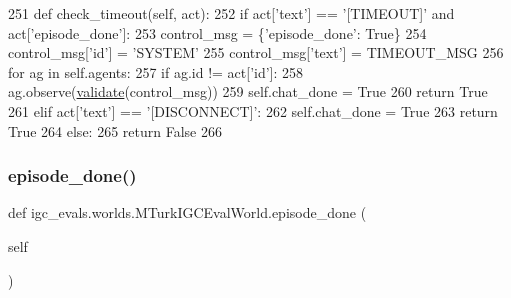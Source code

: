 \begin{DoxyCode}
251     \textcolor{keyword}{def }check\_timeout(self, act):
252         \textcolor{keywordflow}{if} act[\textcolor{stringliteral}{'text'}] == \textcolor{stringliteral}{'[TIMEOUT]'} \textcolor{keywordflow}{and} act[\textcolor{stringliteral}{'episode\_done'}]:
253             control\_msg = \{\textcolor{stringliteral}{'episode\_done'}: \textcolor{keyword}{True}\}
254             control\_msg[\textcolor{stringliteral}{'id'}] = \textcolor{stringliteral}{'SYSTEM'}
255             control\_msg[\textcolor{stringliteral}{'text'}] = TIMEOUT\_MSG
256             \textcolor{keywordflow}{for} ag \textcolor{keywordflow}{in} self.agents:
257                 \textcolor{keywordflow}{if} ag.id != act[\textcolor{stringliteral}{'id'}]:
258                     ag.observe(\hyperlink{namespaceparlai_1_1core_1_1worlds_afc3fad603b7bce41dbdc9cdc04a9c794}{validate}(control\_msg))
259             self.chat\_done = \textcolor{keyword}{True}
260             \textcolor{keywordflow}{return} \textcolor{keyword}{True}
261         \textcolor{keywordflow}{elif} act[\textcolor{stringliteral}{'text'}] == \textcolor{stringliteral}{'[DISCONNECT]'}:
262             self.chat\_done = \textcolor{keyword}{True}
263             \textcolor{keywordflow}{return} \textcolor{keyword}{True}
264         \textcolor{keywordflow}{else}:
265             \textcolor{keywordflow}{return} \textcolor{keyword}{False}
266 
\end{DoxyCode}
\mbox{\label{classigc__evals_1_1worlds_1_1MTurkIGCEvalWorld_a8c3a8c5efdefb5a5475f3290358c2e86}} 
\subsubsection{\texorpdfstring{episode\+\_\+done()}{episode\_done()}}
{\footnotesize\ttfamily def igc\+\_\+evals.\+worlds.\+M\+Turk\+I\+G\+C\+Eval\+World.\+episode\+\_\+done (\begin{DoxyParamCaption}\item[{}]{self }\end{DoxyParamCaption})}



